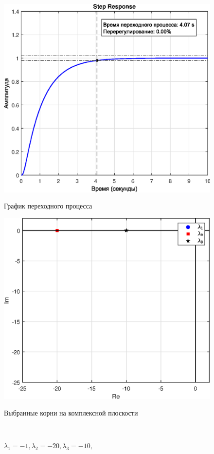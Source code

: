 \documentclass[a4paper]{article}
\begin{document}
\begin{figure}[H]
    \begin{minipage}{0.5\textwidth}
        \centering \includegraphics[width=\textwidth]{ex2/-1_-20_-10.eps}
        \caption{$\lambda_1=-1, \lambda_2=-20, \lambda_3=-10,$}
        \centerline{График переходного процесса}
    \end{minipage}\hfill
    \begin{minipage}{0.5\textwidth}
        \centering \includegraphics[width=\textwidth]{ex2/complex_plan_-1_-20_-10.eps}
        \caption{$\lambda_1=-1, \lambda_2=-20, \lambda_3=-10,$}
        \centerline{Выбранные корни на комплексной плоскости}
    \end{minipage}\\[1em]
\end{figure}\noindent\
\end{document}
